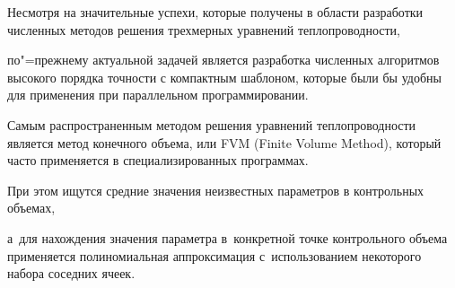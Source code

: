 



%



%


%

%






Несмотря на значительные успехи, которые получены в области разработки численных методов решения трехмерных уравнений теплопроводности, 

по"=прежнему актуальной задачей является разработка численных алгоритмов высокого порядка точности с компактным шаблоном, которые были бы удобны для применения при параллельном программировании. 




Самым распространенным методом решения уравнений теплопроводности является метод конечного объема, или FVM (Finite Volume Method), который часто применяется в специализированных программах. 

При этом ищутся средние значения неизвестных параметров в контрольных объемах, 

а~для нахождения значения параметра в~конкретной точке контрольного объема применяется полиномиальная аппроксимация с~использованием некоторого набора соседних ячеек. 

